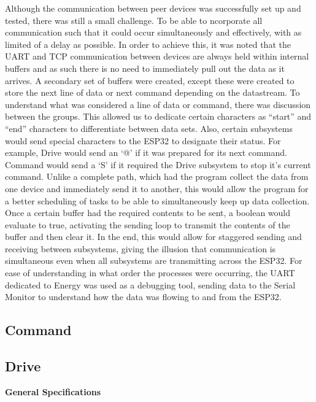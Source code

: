 \documentclass[a4paper]{article}
\begin{document}
Although the communication between peer devices was successfully set
up and tested, there was still a small challenge. To be able to
ncorporate all communication such that it could occur simultaneously and
effectively, with as limited of a delay as possible. In order to achieve
this, it was noted that the UART and TCP communication between devices
are always held within internal buffers and as such there is no need to
immediately pull out the data as it arrives. A secondary set of buffers
were created, except these were created to store the next line of data or
next command depending on the datastream. To understand what was considered
a line of data or command, there was discussion between the groups. This
allowed us to dedicate certain characters as “start” and “end” characters
to differentiate between data sets. Also, certain subsystems would send
special characters to the ESP32 to designate their status. For example,
Drive would send an ‘@’ if it was prepared for its next command. Command
would send a ‘S’ if it required the Drive subsystem to stop it’s current
command. Unlike a complete path, which had the program collect the data
from one device and immediately send it to another, this would allow the
program for a better scheduling of tasks to be able to simultaneously keep
up data collection. Once a certain buffer had the required contents to be
sent, a boolean would evaluate to true, activating the sending loop to
transmit the contents of the buffer and then clear it. In the end, this
would allow for staggered sending and receiving between subsystems, giving
the illusion that communication is simultaneous even when all subsystems
are transmitting across the ESP32. For ease of understanding in what order
the processes were occurring, the UART dedicated to Energy was used as a
debugging tool, sending data to the Serial Monitor to understand how the
data was flowing to and from the ESP32.

\subsection{Command}

\subsection{Drive}

\textbf{General Specifications}
\end{document}
